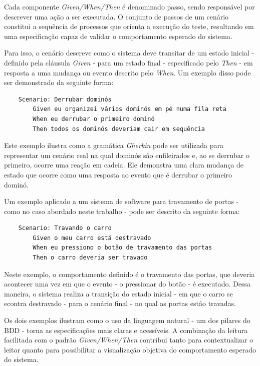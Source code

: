 
Cada componente \textit{Given/When/Then} é denominado passo, sendo responsável por descrever uma ação a ser executada. O conjunto de passos de um cenário constitui a sequência de processos que orienta a execução 
do teste, resultando em uma especificação capaz de validar o comportamento esperado do sistema.

Para isso, o cenário descreve como o sistema deve transitar de um estado inicial - definido pela cláusula \textit{Given} - para um estado final - especificado pelo 
\textit{Then} - em resposta a uma mudança ou evento descrito pelo \textit{When}. Um exemplo disso pode ser demonstrado da seguinte forma:

\begin{verbatim}
	Scenario: Derrubar dominós
		Given eu organizei vários dominós em pé numa fila reta
		When eu derrubar o primeiro dominó
		Then todos os dominós deveriam cair em sequência 
\end{verbatim}

Este exemplo ilustra como a gramática \textit{Gherkin} pode ser utilizada para representar um cenário real na qual dominós são enfileirados e, ao se derrubar o primeiro, 
ocorre uma reação em cadeia. Ele demonstra uma clara mudança de estado que ocorre como uma resposta ao evento que é derrubar o primeiro dominó.

Um exemplo aplicado a um sistema de software para travamento de portas - como no caso abordado neste trabalho - pode ser descrito da seguinte forma:

\begin{verbatim}
	Scenario: Travando o carro
		Given o meu carro está destravado
		When eu pressiono o botão de travamento das portas
		Then o carro deveria ser travado
\end{verbatim}

Neste exemplo, o comportamento definido é o travamento das portas, que deveria acontecer uma vez em que o evento - o pressionar do botão - é executado. Dessa maneira, o
sistema realiza a transição do estado inicial - em que o carro se econtra destravado - para o cenário final - no qual as portas estão travadas.

Os dois exemplos ilustram como o uso da linguagem natural - um dos pilares do BDD - torna as especificações mais claras e acessíveis. A combinação da leitura facilitada 
com o padrão \textit{Given/When/Then} contribui tanto para contextualizar o leitor quanto para possibilitar a visualização objetiva do comportamento esperado do sistema.

